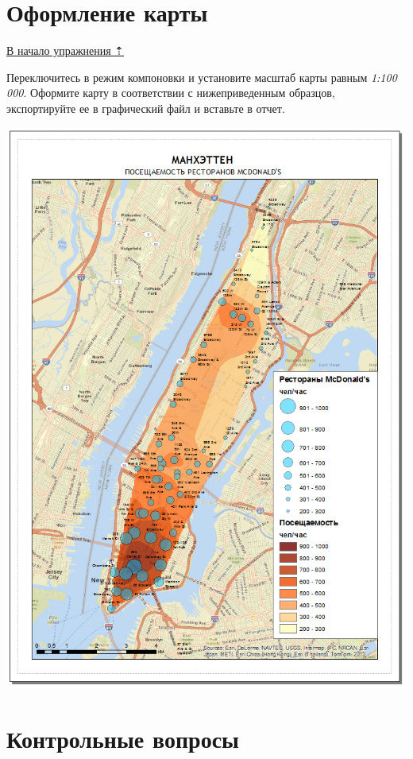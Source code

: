 \documentclass[]{book}
\theoremstyle{definition}
\theoremstyle{definition}
\theoremstyle{definition}
\theoremstyle{remark}
\begin{document}
\hypertarget{geocoding-design}{%
\section{Оформление карты}\label{geocoding-design}}

\protect\hyperlink{geocoding}{В начало упражнения ⇡}

Переключитесь в режим компоновки и установите масштаб карты равным
\emph{1:100 000}. Оформите карту в соответствии с нижеприведенным
образцов, экспортируйте ее в графический файл и вставьте в отчет.

\includegraphics{images/Ex09/image27.png}

\hypertarget{geocoding-questions}{%
\section{Контрольные вопросы}\label{geocoding-questions}}
\end{document}

